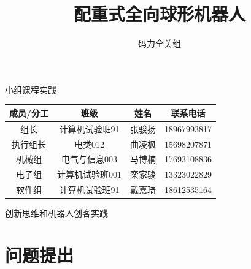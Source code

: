 \documentclass[a4paper]{ctexart}
\title{配重式全向球形机器人}
\author{码力全关组}
\numberwithin{equation}{section}
\numberwithin{table}{section}
\numberwithin{figure}{section}
\begin{document}


\begin{titlepage}

  \maketitle
  \begin{center}
    小组课程实践
  \end{center}


  \begin{center}
  \begin{tabular}[]{cccc}
  \toprule
  成员/分工 & 班级 & 姓名 & 联系电话\\
  \midrule
  组长 & 计算机试验班91 & 张骏扬 & 18967993817 \\
  执行组长 & 电类012 & 曲凌枫 & 15698207871 \\
  机械组 & 电气与信息003 & 马博楠 & 17693108836 \\
  电子组 & 计算机试验班001 & 栾家骏 & 13323022829 \\
  软件组 & 计算机试验班91 & 戴嘉琦 & 18612535164 \\
  \bottomrule
  \end{tabular}
\end{center}
  \addtocounter{table}{-1}

  
\begin{center}
  创新思维和机器人创客实践
\end{center}

\thispagestyle{empty}

\end{titlepage}

\addtocounter{page}{-2}

\newpage

\thispagestyle{fancy}
\lhead{}
\chead{\it\small{\textcolor{grey}{目录}}}
\rhead{}
\cfoot{}

\tableofcontents

\newpage


\pagestyle{fancy}
\fancyhead[RE, LO]{\it\small\rightmark}
\fancyhead[C]{\small{\it\textcolor{grey}{配重式球形机器人}}}

\section{问题提出}
\end{document}
